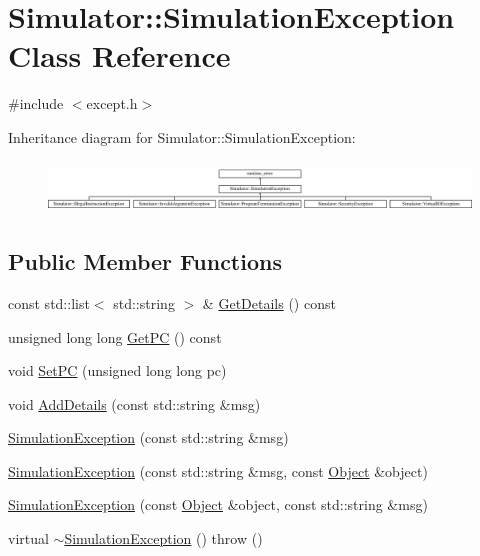 \hypertarget{class_simulator_1_1_simulation_exception}{\section{Simulator\+:\+:Simulation\+Exception Class Reference}
\label{class_simulator_1_1_simulation_exception}
}


{\ttfamily \#include $<$except.\+h$>$}

Inheritance diagram for Simulator\+:\+:Simulation\+Exception\+:\begin{figure}[H]
\begin{center}
\leavevmode
\includegraphics[height=1.365854cm]{class_simulator_1_1_simulation_exception}
\end{center}
\end{figure}
\subsection*{Public Member Functions}
\begin{DoxyCompactItemize}
\item 
const std\+::list$<$ std\+::string $>$ \& \hyperlink{class_simulator_1_1_simulation_exception_ada5888a6342cdb44fec56b85731a08ca}{Get\+Details} () const 
\item 
unsigned long long \hyperlink{class_simulator_1_1_simulation_exception_a5d94ffdca1bada0168a89f598b6a9336}{Get\+P\+C} () const 
\item 
void \hyperlink{class_simulator_1_1_simulation_exception_afcb426ae82d42c84673b9351a98fe28b}{Set\+P\+C} (unsigned long long pc)
\item 
void \hyperlink{class_simulator_1_1_simulation_exception_a98e2d3c991d737cb776cbc28770b91d6}{Add\+Details} (const std\+::string \&msg)
\item 
\hyperlink{class_simulator_1_1_simulation_exception_ad741572a76ef685ce4eb3e6491b87fda}{Simulation\+Exception} (const std\+::string \&msg)
\item 
\hyperlink{class_simulator_1_1_simulation_exception_a7352eeea99178da708a009f69d80e8c7}{Simulation\+Exception} (const std\+::string \&msg, const \hyperlink{class_simulator_1_1_object}{Object} \&object)
\item 
\hyperlink{class_simulator_1_1_simulation_exception_a4c987863c574a267be16e6951d85e482}{Simulation\+Exception} (const \hyperlink{class_simulator_1_1_object}{Object} \&object, const std\+::string \&msg)
\item 
virtual \hyperlink{class_simulator_1_1_simulation_exception_a4c520dceef4e9202e6b012c93546a1bd}{$\sim$\+Simulation\+Exception} ()  throw ()
\end{DoxyCompactItemize}


